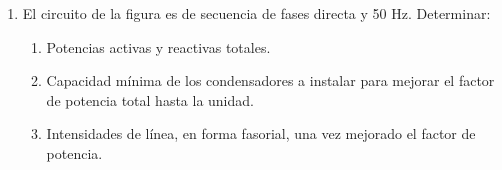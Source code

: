 \begin{enumerate}
Una vez conectados los condensadores del último apartado:
\begin{enumerate}[resume]
\item Calcula el valor eficaz de la corriente de línea total.
\item Calcula el triángulo de potencias a la entrada de la línea.
\item Calcule el valor eficaz de la tensión a la entrada de la línea.
\item Determina la lectura de los vatímetros descritos anteriormente.
\end{enumerate}

  \emph{Sol.:\;
    $P_1 = \SI{30}{\kilo\watt};\; 
    Q_1 = \qty{24.06}{\kilo\voltampere_r};\; 
    S_1 = \SI{38.46}{\kilo\voltampere};\;
    P_2 = \SI{7.5}{\kilo\watt};\; 
    Q_2 = \qty{8.31}{\kilo\voltampere_r};\; 
    S_2 = \SI{11.19}{\kilo\voltampere}; \;
    P_T = \SI{37.5}{\kilo\watt};\; 
    Q_T = \qty{32.37}{\kilo\voltampere_r};\; S_T = \SI{49.54}{\kilo\voltampere};\; 
    I_1 = \qty{55.51}{\ampere};\; 
    I_2 = \qty{16.15}{\ampere};\; 
    I_T= \qty{71.5}{\ampere};\; 
    W_{A,AC} = \SI{28.09}{\kilo\watt};\;
    W_{B,BC} = \SI{9.41}{\kilo\watt};\;
    W_{C, BA} = \SI{-18.66}{\kilo\watt};\;
    P_g = \SI{39.73}{\kilo\watt};\; 
    Q_g = \qty{32.33}{\kilo\voltampere_r};\; 
    S_g = \SI{51.22}{\kilo\voltampere};\; 
    U_g = \qty{413.64}{\volt};\; 
    C_{\triangle} = \qty{214.4}{\micro\farad}/\mathrm{fase};\;
    I_T' = \qty{54.13}{\ampere};\; 
    P_g' = \SI{38.78}{\kilo\watt};\; 
    Q_g' = \qty{0}{\voltampere_r};\; 
    S_g' = \SI{38.78}{\kilo\voltampere};\; 
    U'_g = \qty{413.63}{\volt};\;
    W_{A,AC}' = \SI{18.75}{\kilo\watt};\;
    W_{B,BC}' = \SI{18.75}{\kilo\watt};\; 
    W'_{C,BA} = \SI{0}{\kilo\watt}$ }

 
\item El circuito de la figura es de secuencia de fases directa y 50
  Hz. Determinar:
  \begin{enumerate}
  \item Potencias activas y reactivas totales.
  \item Capacidad mínima de los condensadores a instalar para mejorar
    el factor de potencia total hasta la unidad.
  \item Intensidades de línea, en forma fasorial, una vez mejorado el
    factor de potencia.
  \end{enumerate}
  \begin{minipage}{0.4\linewidth}


\end{minipage}
\end{enumerate}
